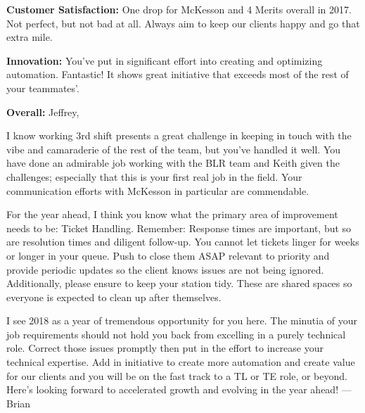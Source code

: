 


\begin{cvparagraph}
    {\bfseries Customer Satisfaction:} One drop for McKesson and 4 Merits overall in 2017. 
    Not perfect, but not bad at all. 
    Always aim to keep our clients happy and go that extra mile.

    {\bfseries Innovation:} You've put in significant effort into creating and optimizing automation. 
    Fantastic! 
    It shows great initiative that exceeds most of the rest of your teammates'.

    {\bfseries Overall:}
Jeffrey,

I know working 3rd shift presents a great challenge in keeping in touch with the vibe and camaraderie of the rest of the team, but you've handled it well.
You have done an admirable job working with the BLR team and Keith given the challenges; especially that this is your first real job in the field.
Your communication efforts with McKesson in particular are commendable.

For the year ahead, I think you know what the primary area of improvement needs to be: Ticket Handling.
Remember: Response times are important, but so are resolution times and diligent follow-up.
You cannot let tickets linger for weeks or longer in your queue.
Push to close them ASAP relevant to priority and provide periodic updates so the client knows issues are not being ignored.
Additionally, please ensure to keep your station tidy.
These are shared spaces so everyone is expected to clean up after themselves.

I see 2018 as a year of tremendous opportunity for you here.
The minutia of your job requirements should not hold you back from excelling in a purely technical role.
Correct those issues promptly then put in the effort to increase your technical expertise.
Add in initiative to create more automation and create value for our clients and you will be on the fast track to a TL or TE role, or beyond.
Here's looking forward to accelerated growth and evolving in the year ahead!
---Brian
\end{cvparagraph}

